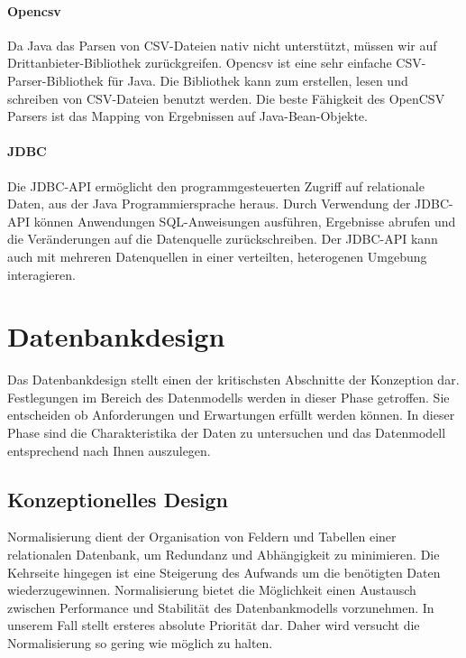 \paragraph{Opencsv}

Da Java das Parsen von CSV-Dateien nativ nicht unterstützt, müssen wir auf Drittanbieter-Bibliothek zurückgreifen. Opencsv ist eine sehr einfache CSV-Parser-Bibliothek für Java. Die Bibliothek kann zum erstellen, lesen und schreiben von CSV-Dateien benutzt werden. Die beste Fähigkeit des OpenCSV Parsers ist das Mapping von Ergebnissen auf Java-Bean-Objekte.

\paragraph{JDBC}

Die JDBC-API ermöglicht den programmgesteuerten Zugriff auf relationale Daten, aus der Java Programmiersprache heraus. Durch Verwendung der JDBC-API können Anwendungen SQL-Anweisungen ausführen, Ergebnisse abrufen und die Veränderungen auf die Datenquelle zurückschreiben. Der JDBC-API kann auch mit mehreren Datenquellen in einer verteilten, heterogenen Umgebung interagieren. 

\section{Datenbankdesign}

Das Datenbankdesign stellt einen der kritischsten Abschnitte der Konzeption dar. Festlegungen im Bereich des Datenmodells werden in dieser Phase getroffen. Sie entscheiden ob Anforderungen und Erwartungen erfüllt werden können. In dieser Phase sind die Charakteristika der Daten zu untersuchen und das Datenmodell entsprechend nach Ihnen auszulegen.

\subsection{Konzeptionelles Design}

Normalisierung dient der Organisation von Feldern und Tabellen einer relationalen Datenbank, um Redundanz und Abhängigkeit zu minimieren. Die Kehrseite hingegen ist eine Steigerung des Aufwands um die benötigten Daten wiederzugewinnen. Normalisierung bietet die Möglichkeit einen Austausch zwischen Performance und Stabilität des Datenbankmodells vorzunehmen. 
In unserem Fall stellt ersteres absolute Priorität dar. Daher wird versucht die Normalisierung so gering wie möglich zu halten. 

